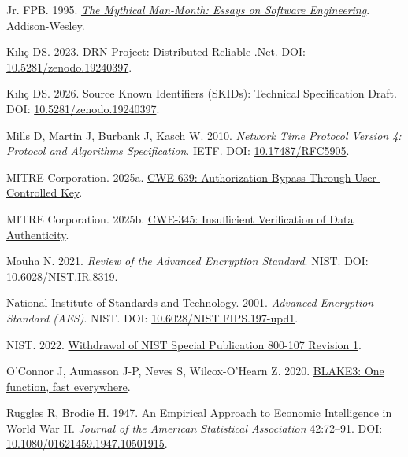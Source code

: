 \documentclass[fleqn,10pt]{wlpeerj}
\newlength{\cslhangindent}
\newenvironment{CSLReferences}[2]
 {\begin{list}{}{%
  \setlength{\itemindent}{0pt}
  \setlength{\leftmargin}{0pt}
  \setlength{\parsep}{0pt}
  \ifodd #1
   \setlength{\leftmargin}{\cslhangindent}
   \setlength{\itemindent}{-1\cslhangindent}
  \fi
  \setlength{\itemsep}{#2\baselineskip}}}
 {\end{list}}
\begin{document}
\begin{CSLReferences}{1}{0}
Jr. FPB. 1995.
\emph{\href{https://www.oreilly.com/library/view/mythical-man-month-the/0201835959/}{{The
Mythical Man-Month: Essays on Software Engineering}}}. Addison-Wesley.

Kılıç DS. 2023. {DRN-Project: Distributed Reliable .Net}. DOI:
\href{https://doi.org/10.5281/zenodo.19240397}{10.5281/zenodo.19240397}.

Kılıç DS. 2026. {Source Known Identifiers (SKIDs): Technical
Specification Draft}. DOI:
\href{https://doi.org/10.5281/zenodo.19240397}{10.5281/zenodo.19240397}.

Mills D, Martin J, Burbank J, Kasch W. 2010. \emph{{Network Time
Protocol Version 4: Protocol and Algorithms Specification}}. IETF. DOI:
\href{https://doi.org/10.17487/RFC5905}{10.17487/RFC5905}.

MITRE Corporation. 2025a.
\href{https://cwe.mitre.org/data/definitions/639.html}{{CWE-639:
Authorization Bypass Through User-Controlled Key}}.

MITRE Corporation. 2025b.
\href{https://cwe.mitre.org/data/definitions/345.html}{{CWE-345:
Insufficient Verification of Data Authenticity}}.

Mouha N. 2021. \emph{{Review of the Advanced Encryption Standard}}.
NIST. DOI:
\href{https://doi.org/10.6028/NIST.IR.8319}{10.6028/NIST.IR.8319}.

National Institute of Standards and Technology. 2001. \emph{{Advanced
Encryption Standard (AES)}}. NIST. DOI:
\href{https://doi.org/10.6028/NIST.FIPS.197-upd1}{10.6028/NIST.FIPS.197-upd1}.

NIST. 2022.
\href{https://csrc.nist.gov/news/2022/withdrawal-of-nist-sp-800-107-revision-1}{{Withdrawal
of NIST Special Publication 800-107 Revision 1}}.

O'Connor J, Aumasson J-P, Neves S, Wilcox-O'Hearn Z. 2020.
\href{https://github.com/BLAKE3-team/BLAKE3-specs/blob/master/blake3.pdf}{{BLAKE3:
One function, fast everywhere}}.

Ruggles R, Brodie H. 1947. {An Empirical Approach to Economic
Intelligence in World War II}. \emph{Journal of the American Statistical
Association} 42:72--91. DOI:
\href{https://doi.org/10.1080/01621459.1947.10501915}{10.1080/01621459.1947.10501915}.


\end{CSLReferences}
\end{document}
